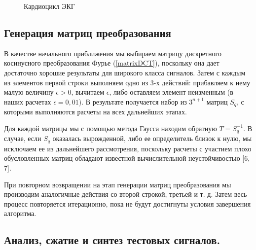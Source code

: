 \documentclass[11pt, oneside, a4paper]{article}
\begin{document}
\begin{figure}[h]
	\caption{Кардиоцикл ЭКГ}
	\label{qsr-complex}
\end{figure}

\subsection{Генерация матриц преобразования}

В качестве начального приближения мы выбираем матрицу дискретного косинусного преобразования Фурье (\ref{matrixDCT}), поскольку она дает достаточно хорошие результаты для широкого класса сигналов. Затем с каждым из элементов первой строки выполняем одно из 3-х действий: прибавляем к нему малую величину $\epsilon>0$, вычитаем $\epsilon$, либо оставляем элемент неизменным (в наших расчетах $\epsilon=0,01$). В результате получается набор из $3^{n+1}$ матриц $S_q$, с которыми выполняются расчеты на всех дальнейших этапах.

Для каждой матрицы мы с помощью метода Гаусса находим обратную $T=S_q^{-1}$. В случае, если $S_q$ оказалась вырожденной, либо ее определитель близок к нулю, мы исключаем ее из дальнейшего рассмотрения, поскольку расчеты с участием плохо обусловленных матриц обладают известной вычислительной неустойчивостью [6, 7].

При повторном возвращении на этап генерации матриц преобразования мы производим аналогичные действия со второй строкой, третьей и т. д. Затем весь процесс повторяется итерационно, пока не будут достигнуты условия завершения алгоритма. 

\subsection{Анализ, сжатие и синтез тестовых сигналов.}
\end{document}
